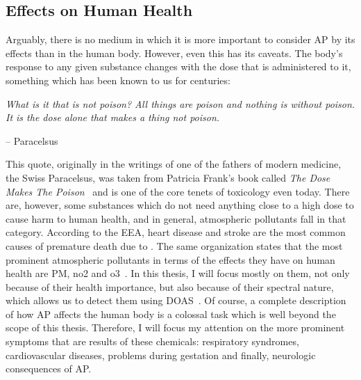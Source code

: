 

\subsection{ Effects on Human Health}%
\label{sub:ap_effects_on_human_health}

Arguably, there is no medium in which it is more important to consider
\gls{AP} by its effects than in the human body. However, even this has
its caveats. The body's response to any given substance changes with the
dose that is administered to it, something which has been known to us
for centuries:

\begin{flushright}
    \begin{minipage}{0.8\textwidth}
        \noindent
        \textit{
            What is it that is not poison? All things are poison and
            nothing is without poison. It is the dose alone that makes a
            thing not poison.
        }

        \hfill-- Paracelsus
    \end{minipage}
\end{flushright}

This quote, originally in the writings of one of the fathers of modern
medicine, the Swiss Paracelsus, was taken from Patricia Frank's book
called \emph{The Dose Makes The Poison}~\cite{Frank2011} and is one of
the core tenets of toxicology even today. There are, however, some
substances which do not need anything close to a high dose to cause harm
to human health, and in general, atmospheric pollutants fall in that
category. According to the \gls{EEA}, heart disease and stroke are the
most common causes of premature death due to . The same
organization states that the most prominent atmospheric pollutants in
terms of the effects they have on human health are \gls{PM}, \gls{no2}
and \gls{o3}~\cite{EEA2016, EEA2007}. In this thesis, I will focus
mostly on them, not only because of their health importance, but also
because of their spectral nature, which allows us to detect them using
\gls{DOAS}~\cite{Platt2007}. Of course, a complete description of how
\gls{AP} affects the human body is a colossal task which is well beyond
the scope of this thesis.  Therefore, I will focus my attention on the
more prominent symptoms that are results of these chemicals: respiratory
syndromes, cardiovascular diseases, problems during gestation and
finally, neurologic consequences of \gls{AP}.

